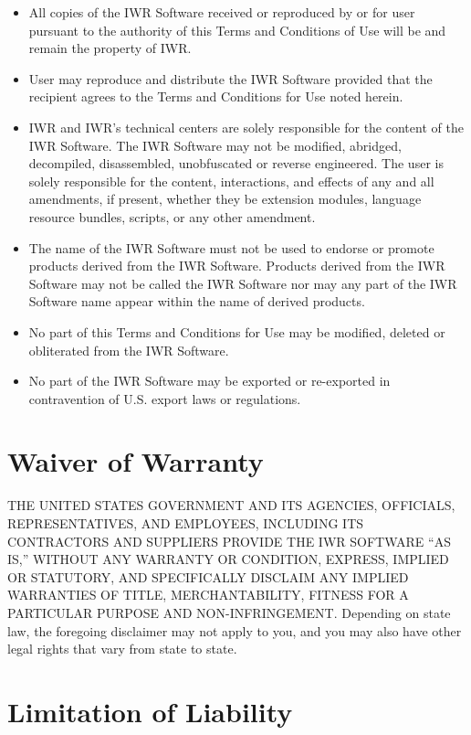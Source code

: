 \documentclass[
]{book}
\begin{document}
\begin{itemize}
\item
  All copies of the IWR Software received or reproduced by or for user pursuant to the authority of this Terms and Conditions of Use will be and remain the property of IWR.
\item
  User may reproduce and distribute the IWR Software provided that the recipient agrees to the Terms and Conditions for Use noted herein.
\item
  IWR and IWR's technical centers are solely responsible for the content of the IWR Software. The IWR Software may not be modified, abridged, decompiled, disassembled, unobfuscated or reverse engineered. The user is solely responsible for the content, interactions, and effects of any and all amendments, if present, whether they be extension modules, language resource bundles, scripts, or any other amendment.
\item
  The name of the IWR Software must not be used to endorse or promote products derived from the IWR Software. Products derived from the IWR Software may not be called the IWR Software nor may any part of the IWR Software name appear within the name of derived products.
\item
  No part of this Terms and Conditions for Use may be modified, deleted or obliterated from the IWR Software.
\item
  No part of the IWR Software may be exported or re-exported in contravention of U.S. export laws or regulations.
\end{itemize}

\section{Waiver of Warranty}\label{waiver-of-warranty}

THE UNITED STATES GOVERNMENT AND ITS AGENCIES, OFFICIALS, REPRESENTATIVES, AND EMPLOYEES, INCLUDING ITS CONTRACTORS AND SUPPLIERS PROVIDE THE IWR SOFTWARE ``AS IS,'' WITHOUT ANY WARRANTY OR CONDITION, EXPRESS, IMPLIED OR STATUTORY, AND SPECIFICALLY DISCLAIM ANY IMPLIED WARRANTIES OF TITLE, MERCHANTABILITY, FITNESS FOR A PARTICULAR PURPOSE AND NON-INFRINGEMENT. Depending on state law, the foregoing disclaimer may not apply to you, and you may also have other legal rights that vary from state to state.

\section{Limitation of Liability}\label{limitation-of-liability}
\end{document}
